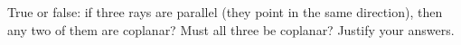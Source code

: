True or false: if three rays are parallel (they point in the same direction), then any two of them are coplanar? Must all three be coplanar? Justify your answers.
